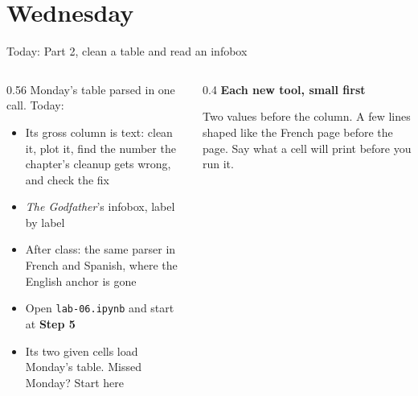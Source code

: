 \documentclass[9pt,aspectratio=169]{beamer}
\begin{document}
\section{Wednesday}

\begin{frame}{Today: Part 2, clean a table and read an infobox}
    \begin{columns}[T]
        \begin{column}{0.56\textwidth}
            Monday's table parsed in one call. Today:
            \begin{itemize}\small
                \item Its gross column is text: clean it, plot it, find the number the chapter's cleanup gets wrong, and check the fix
                \item \textit{The Godfather}'s infobox, label by label
                \item After class: the same parser in French and Spanish, where the English anchor is gone
            \end{itemize}

            \medskip
            \begin{itemize}\small
                \item Open \texttt{lab-06.ipynb} and start at \textbf{Step 5}
                \item Its two given cells load Monday's table. Missed Monday? Start here
            \end{itemize}
        \end{column}
        \begin{column}{0.4\textwidth}
            \textbf{Each new tool, small first}\\[2pt]
            {\footnotesize Two values before the column. A few lines shaped like the French page before the page. Say what a cell will print before you run it.\par}
        \end{column}
    \end{columns}
\end{frame}
\end{document}
